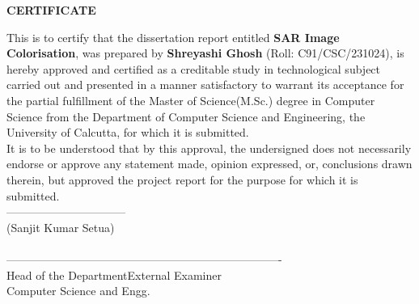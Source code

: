 \begin{center}
    {\large {\bf CERTIFICATE}}
\end{center}

This is to certify that the dissertation report entitled \textbf{SAR Image Colorisation}, was prepared by \textbf{Shreyashi Ghosh} (Roll: C91/CSC/231024), is hereby approved and certified as a creditable study in technological subject carried out and presented in a manner satisfactory to warrant its acceptance for the partial fulfillment of the Master of Science(M.Sc.) degree in Computer Science from the Department of Computer Science and Engineering, the University of Calcutta, for which it is submitted. \\
It is to be understood that by this approval, the undersigned does not necessarily endorse or approve any statement made, opinion expressed, or, conclusions drawn therein, but approved the project report for the purpose for which it is submitted.
\\[.5cm]

\large{--------------------------------}\\
\hspace*{.4in}\large{(Sanjit Kumar Setua)}\\
\hspace*{.5in}\\[1.0cm]

\large{---------------------------------------}\hspace*{1.5in}\large{----------------------------------}\\
\hspace*{.4in}\large{Head of the Department}\hspace*{2.2in}\large{External Examiner}
\\[0.1cm]
\hspace*{.2in}Computer Science and Engg.